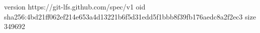 version https://git-lfs.github.com/spec/v1
oid sha256:4bd21ff062ef214e653a4d13221b6f5d31edd5f1bbb8f39fb176aedc8a2f2ec3
size 349692
